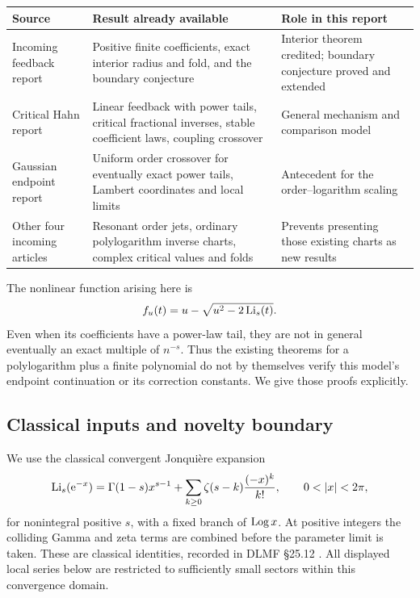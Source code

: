 \begin{longtable}{@{}>{\raggedright\arraybackslash}p{}>{\raggedright\arraybackslash}p{}>{\raggedright\arraybackslash}p{}@{}}
\toprule
Source & Result already available & Role in this report\\
\midrule
\endhead
Incoming feedback report \cite{RepoFeedback}
& Positive finite coefficients, exact interior radius and fold,
and the boundary conjecture
& Interior theorem credited; boundary conjecture proved and extended\\
Critical Hahn report \cite{RepoHahn}
& Linear feedback with power tails, critical fractional inverses,
stable coefficient laws, coupling crossover
& General mechanism and comparison model\\
Gaussian endpoint report \cite{RepoGaussian}
& Uniform order crossover for eventually exact power tails,
Lambert coordinates and local limits
& Antecedent for the order--logarithm scaling\\
Other four incoming articles \cite{RepoJets,RepoUniform,RepoNormalized,RepoFolds}
& Resonant order jets, ordinary polylogarithm inverse charts,
complex critical values and folds
& Prevents presenting those existing charts as new results\\
\bottomrule
\end{longtable}
\addtocounter{table}{-1}%

The nonlinear function arising here is
\begin{equation}\label{eq:fdef-intro}
 f_u(t)=u-\sqrt{u^2-2\operatorname{Li}_s(t)}.
\end{equation}
Even when its coefficients have a power-law tail, they are not in
general eventually an exact multiple of $n^{-s}$.  Thus the existing
theorems for a polylogarithm plus a finite polynomial do not by
themselves verify this model's endpoint continuation or its correction
constants.  We give those proofs explicitly.

\subsection{Classical inputs and novelty boundary}

We use the classical convergent Jonqui\`ere expansion
\begin{equation}\label{eq:jonquiere}
 \Li_s(\ee^{-x})=
 \Gamma(1-s)x^{s-1}+
 \sum_{k\ge0}\zeta(s-k)\frac{(-x)^k}{k!},
 \qquad 0<|x|<2\pi,
\end{equation}
for nonintegral positive $s$, with a fixed branch of $\operatorname{Log} x$.
At positive integers the colliding Gamma and zeta terms are combined
before the parameter limit is taken.  These are classical identities,
recorded in DLMF \S25.12 \cite{DLMFPolylog}.
All displayed local series below are restricted to sufficiently small
sectors within this convergence domain.


